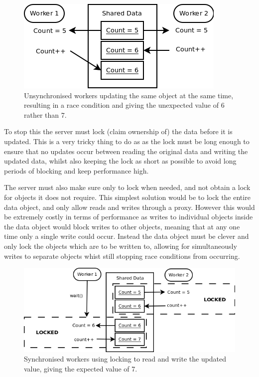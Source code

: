 \begin{figure}[!h]
    \begin{center}
        \includegraphics[scale=0.6]{Design/diagrams/server_race_condition.png}
        \caption{Unsynchronised workers updating the same object at the same time, resulting in a race condition and giving the unexpected value of 6 rather than 7.}
        \label{RaceConditionDia}
    \end{center}
\end{figure}

To stop this the server must lock (claim ownership of) the data before it is updated. This is a very tricky thing to do as as the lock must be long enough to ensure that no updates occur between reading the original data and writing the updated data, whilst also keeping the lock as short as possible to avoid long periods of blocking and keep performance high.


The server must also make sure only to lock when needed, and not obtain a lock for objects it does not require. This simplest solution would be to lock the entire data object, and only allow reads and writes through a proxy. However this would be extremely costly in terms of performance as writes to individual objects inside the data object would block writes to other objects, meaning that at any one time only a single write could occur. Instead the data object must be clever and only lock the objects which are to be written to, allowing for simultaneously writes to separate objects whist still stopping race conditions from occurring.

\begin{figure}[!h]
    \begin{center}
        \includegraphics[scale=0.6]{Design/diagrams/server_locking.png}
        \caption{Synchronised workers using locking to read and write the updated value, giving the expected value of 7.}
        \label{lockingDia}
    \end{center}
\end{figure}

